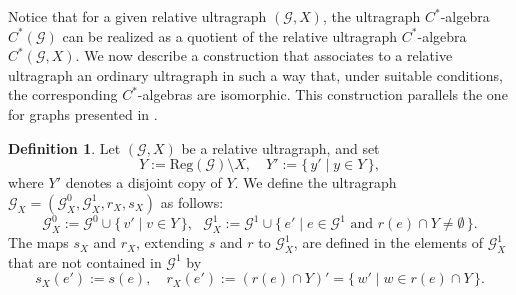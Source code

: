 \documentclass[12pt, reqno]{amsart}
\newtheorem{proposition}[theorem]{Proposition}
\theoremstyle{definition}
\newtheorem{definition}[theorem]{Definition}
\theoremstyle{remark}
\newtheorem{remark}[theorem]{Remark}
\numberwithin{equation}{section}
\newcommand{\G}{\mathcal{G}}
\begin{document}
Notice that for a given relative ultragraph $(\mathcal{G}, X)$, the ultragraph 
$C^*$-algebra $C^*(\mathcal{G})$ can be realized as a quotient of the relative 
ultragraph $C^*$-algebra $C^*(\mathcal{G}, X)$. We now describe a construction 
that associates to a relative ultragraph an ordinary ultragraph in such a way 
that, under suitable conditions, the corresponding $C^*$-algebras are isomorphic. 
This construction parallels the one for graphs presented in 
\cite[Theorem~3.7]{Tom}.




\begin{definition}\label{ultragrap GX}
Let $(\mathcal{G},X)$ be a relative ultragraph, and set 
\[
Y := \mathrm{Reg}(\mathcal{G}) \setminus X, 
\quad 
Y' := \{\, y' \mid y \in Y \,\},
\]
where $Y'$ denotes a disjoint copy of $Y$.  
We define the ultragraph $\mathcal{G}_X = (\mathcal{G}^0_X, \mathcal{G}^1_X, r_X, s_X)$ as follows:
\[
\mathcal{G}_X^0 := \mathcal{G}^0 \cup \{\, v' \mid v \in Y \,\},
\ \ \ \mathcal{G}_X^1 := \mathcal{G}^1 \cup \{\, e' \mid e \in \mathcal{G}^1 \text{ and } r(e) \cap Y \neq \emptyset \,\}.
\]
The maps $s_X$ and $r_X$, extending $s$ and $r$ to $\mathcal{G}_X^1$, are defined in the elements of $\mathcal{G}_X^1$ that  are not contained in $\mathcal{G}^1$ by
\[
s_X(e') := s(e), 
\quad 
r_X(e') := (r(e) \cap Y)' = \{\, w' \mid w \in r(e) \cap Y \,\}.
\]
\end{definition}
\end{document}
